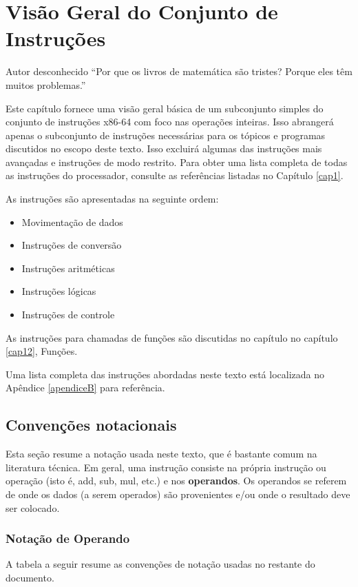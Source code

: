 \chapter{Visão Geral do Conjunto de Instruções}

\begin{chapquote}{Autor desconhecido}
``Por que os livros de matemática são tristes?
Porque eles têm muitos problemas.''
\end{chapquote}

Este capítulo fornece uma visão geral básica de um subconjunto simples do conjunto de instruções x86-64 com foco nas operações inteiras. Isso abrangerá apenas o subconjunto de instruções necessárias para os tópicos e programas discutidos no escopo deste texto. Isso excluirá algumas das instruções mais avançadas e instruções de modo restrito. Para obter uma lista completa de todas as instruções do processador, consulte as referências listadas no Capítulo \ref{cap1}.

As instruções são apresentadas na seguinte ordem:
\begin{itemize}
	\item Movimentação de dados
	\item Instruções de conversão
	\item Instruções aritméticas
	\item Instruções lógicas
	\item Instruções de controle
\end{itemize}

As instruções para chamadas de funções são discutidas no capítulo no capítulo \ref{cap12}, Funções.

Uma lista completa das instruções abordadas neste texto está localizada no Apêndice \ref{apendiceB} para referência.

\section{Convenções notacionais}
Esta seção resume a notação usada neste texto, que é bastante comum na literatura técnica. Em geral, uma instrução consiste na própria instrução ou operação (isto é, add, sub, mul, etc.) e nos \textbf{operandos}. Os operandos se referem de onde os dados (a serem operados) são provenientes e/ou onde o resultado deve ser colocado.

\subsection{Notação de Operando}
A tabela a seguir resume as convenções de notação usadas no restante do documento.

